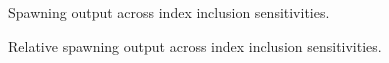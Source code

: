 \documentclass[
]{scrartcl}
\begin{document}
\begin{figure}


\caption{\label{fig-sens_indices_spout}Spawning output across index
inclusion sensitivities.}

\end{figure}%

\begin{figure}


\caption{\label{fig-sens_indices_status}Relative spawning output across
index inclusion sensitivities.}

\end{figure}%
\end{document}
